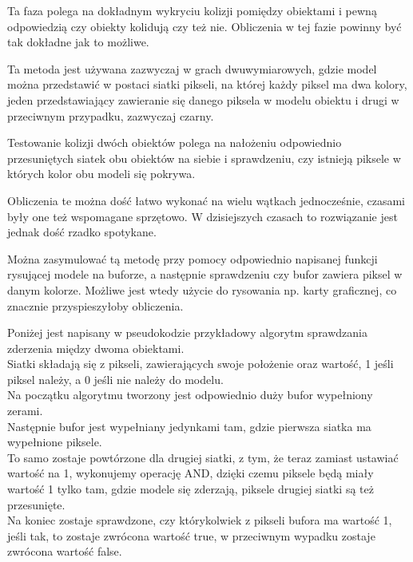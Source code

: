 
Ta faza polega na dokładnym wykryciu kolizji pomiędzy obiektami i pewną odpowiedzią czy obiekty kolidują czy też nie. Obliczenia w tej fazie powinny być tak dokładne jak to możliwe.\\

\smallskip

Ta metoda jest używana zazwyczaj w grach dwuwymiarowych, gdzie model można przedstawić w postaci siatki pikseli, na której każdy piksel ma dwa kolory, jeden przedstawiający zawieranie się danego piksela w modelu obiektu i drugi w przeciwnym przypadku, zazwyczaj czarny.

Testowanie kolizji dwóch obiektów polega na nałożeniu odpowiednio przesuniętych siatek obu obiektów na siebie i sprawdzeniu, czy istnieją piksele w których kolor obu modeli się pokrywa.

Obliczenia te można do\'sć łatwo wykonać na wielu wątkach jednocze\'snie, czasami były one też wspomagane sprzętowo. W dzisiejszych czasach to rozwiązanie jest jednak do\'sć rzadko spotykane.

Można zasymulować tą metodę przy pomocy odpowiednio napisanej funkcji rysującej modele na buforze, a następnie sprawdzeniu czy bufor zawiera piksel w danym kolorze. Możliwe jest wtedy użycie do rysowania np. karty graficznej, co znacznie przyspieszyłoby obliczenia.\bigskip

Poniżej jest napisany w pseudokodzie przykładowy algorytm sprawdzania zderzenia między dwoma obiektami.\\
Siatki składają się z pikseli, zawierających swoje położenie oraz warto\'sć, 1 je\'sli piksel należy, a 0 je\'sli nie należy do modelu.\\
Na początku algorytmu tworzony jest odpowiednio duży bufor wypełniony zerami.\\
Następnie bufor jest wypełniany jedynkami tam, gdzie pierwsza siatka ma wypełnione piksele.\\
To samo zostaje powtórzone dla drugiej siatki, z tym, że teraz zamiast ustawiać warto\'sć na 1, wykonujemy operację AND, dzięki czemu piksele będą miały warto\'sć 1 tylko tam, gdzie modele się zderzają, piksele drugiej siatki są też przesunięte.\\
Na koniec zostaje sprawdzone, czy którykolwiek z pikseli bufora ma warto\'sć 1, je\'sli tak, to zostaje zwrócona warto\'sć true, w przeciwnym wypadku zostaje zwrócona warto\'sć false.\bigskip

